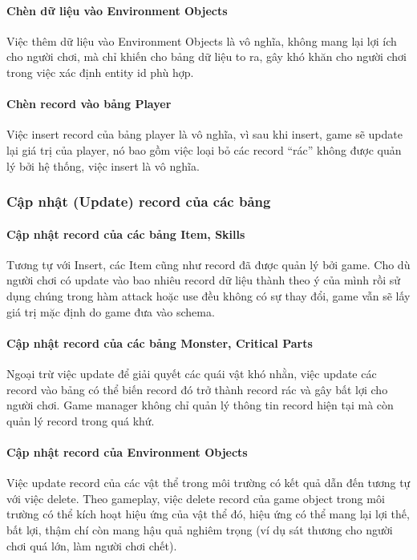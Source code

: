 \paragraph{Chèn dữ liệu vào Environment Objects}
Việc thêm dữ liệu vào Environment Objects là vô nghĩa, không mang lại lợi ích cho người chơi, mà chỉ khiến cho bảng dữ liệu to ra, gây khó khăn cho người chơi trong việc xác định entity id phù hợp.

\paragraph{Chèn record vào bảng Player}
Việc insert record của bảng player là vô nghĩa, vì sau khi insert, game sẽ update lại giá trị của player, nó bao gồm việc loại bỏ các record ``rác'' không được quản lý bởi hệ thống, việc insert là vô nghĩa.

\subsubsection{Cập nhật (Update) record của các bảng}

\paragraph{Cập nhật record của các bảng Item, Skills}
Tương tự với Insert, các Item cũng như record đã được quản lý bởi game. Cho dù người chơi có update vào bao nhiêu record dữ liệu thành theo ý của mình rồi sử dụng chúng trong hàm attack hoặc use đều không có sự thay đổi, game vẫn sẽ lấy giá trị mặc định do game đưa vào schema.

\paragraph{Cập nhật record của các bảng Monster, Critical Parts}
Ngoại trừ việc update để giải quyết các quái vật khó nhằn, việc update các record vào bảng có thể biến record đó trở thành record rác và gây bất lợi cho người chơi. Game manager không chỉ quản lý thông tin record hiện tại mà còn quản lý record trong quá khứ.

\paragraph{Cập nhật record của Environment Objects}
Việc update record của các vật thể trong môi trường có kết quả dẫn đến tương tự với việc delete. Theo gameplay, việc delete record của game object trong môi trường có thể kích hoạt hiệu ứng của vật thể đó, hiệu ứng có thể mang lại lợi thế, bất lợi, thậm chí còn mang hậu quả nghiêm trọng (ví dụ sát thương cho người chơi quá lớn, làm người chơi chết).

